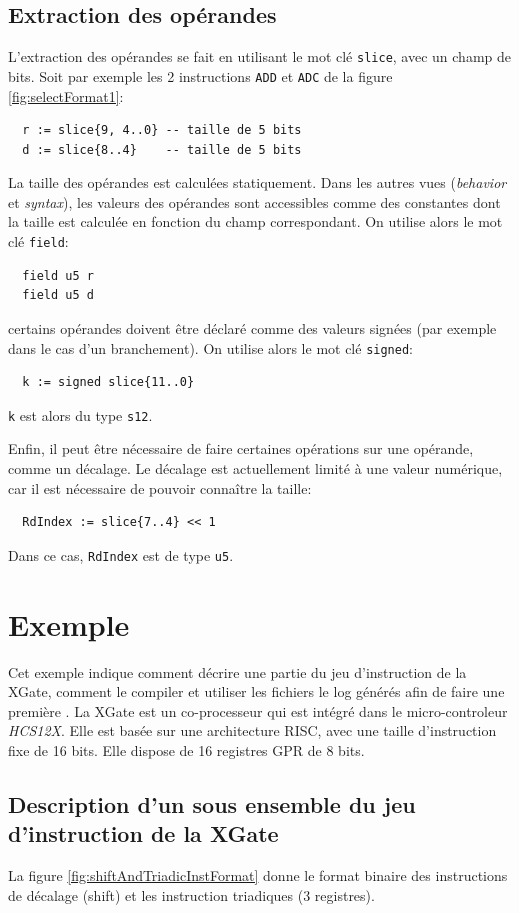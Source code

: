 \subsection{Extraction des opérandes}
\label{sec:operandeFormat}
L'extraction des opérandes se fait en utilisant le mot clé \texttt{slice}, avec un champ de bits. Soit par exemple les 2 instructions \texttt{ADD} et \texttt{ADC} de la figure  \ref{fig:selectFormat1}:
\begin{lstlisting}
  r := slice{9, 4..0} -- taille de 5 bits
  d := slice{8..4}    -- taille de 5 bits
\end{lstlisting}
La taille des opérandes est calculées statiquement. Dans les autres vues (\emph{behavior} et \emph{syntax}), les valeurs des opérandes sont accessibles comme des constantes dont la taille est calculée en fonction du champ correspondant. On utilise alors le mot clé \texttt{field}:
\begin{lstlisting}
  field u5 r
  field u5 d
\end{lstlisting}

certains opérandes doivent être déclaré comme des valeurs signées (par exemple dans le cas d'un branchement). On utilise alors le mot clé \texttt{signed}:
\begin{lstlisting}
  k := signed slice{11..0}
\end{lstlisting}
\texttt{k} est alors du type \texttt{s12}.

Enfin, il peut être nécessaire de faire certaines opérations sur une opérande, comme un décalage. Le décalage est actuellement limité à une valeur numérique, car il est nécessaire de pouvoir connaître la taille:
\begin{lstlisting}
  RdIndex := slice{7..4} << 1
\end{lstlisting}
Dans ce cas, \texttt{RdIndex} est de type \texttt{u5}.

\section{Exemple}

Cet exemple indique comment décrire une partie du jeu d'instruction de la XGate, comment le compiler et utiliser les fichiers le log générés afin de faire une première . La XGate est un co-processeur qui est intégré dans le micro-controleur \emph{HCS12X}. Elle est basée sur une architecture RISC, avec une taille d'instruction fixe de 16 bits. Elle dispose de 16 registres GPR de 8 bits.

\subsection{Description d'un sous ensemble du jeu d'instruction de la XGate}
La figure \ref{fig:shiftAndTriadicInstFormat} donne le format binaire des instructions de décalage (shift) et les instruction triadiques (3 registres).


